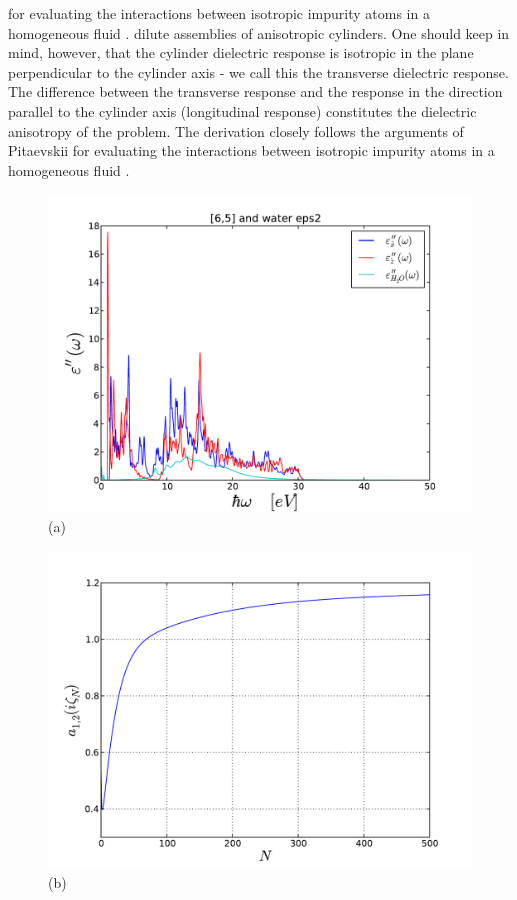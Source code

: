 \documentclass[onecolumn,letterpaper,amsmath,amssymb,floatfix,aps,superscriptaddress]{revtex4}
\begin{document}
for evaluating the interactions between isotropic impurity 
atoms in a homogeneous fluid \cite{Pitaevskii}. 
dilute assemblies of anisotropic cylinders. One should keep in mind, however, that the cylinder dielectric response is isotropic in the plane perpendicular 
to the cylinder axis - we call this the transverse dielectric response. The difference between the transverse response and the response in the direction parallel 
to the cylinder axis (longitudinal response) constitutes the dielectric anisotropy of the problem. The derivation closely follows the arguments of Pitaevskii 
for evaluating the interactions between isotropic impurity 
atoms in a homogeneous fluid \cite{Pitaevskii}. 

\begin{figure}[t!]
\begin{center}
\begin{minipage}[b]{0.40\textwidth}
\begin{center}
\includegraphics[width=1.2\textwidth]{eps_65.pdf} (a)
\end{center}
\end{minipage}
\hskip 43pt
\begin{minipage}[b]{0.40\textwidth}
\begin{center}
\includegraphics[width=1.2\textwidth]{aiz_65.pdf} (b)

\end{center}
\end{minipage}
\end{center}
\end{figure}
\end{document}
